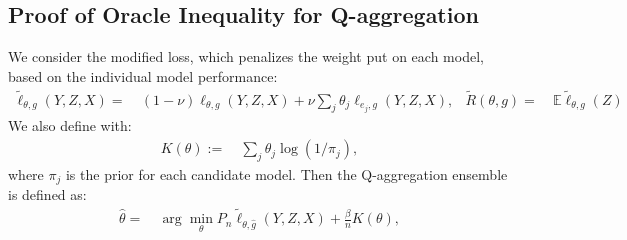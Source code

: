 \documentclass[12pt]{extarticle} %
\newcommand{\E}{\mathbb{E}}
\newcommand{\error}{\ensuremath{\textsc{Error}}}
\begin{document}


\subsection{Proof of Oracle Inequality for Q-aggregation}\label{sec:Q-agg}
We consider the modified loss, which penalizes the weight put on each model, based on the individual model performance:
\begin{align*}
    \tilde{\ell}_{\theta,g}(Y,Z,X) =~& (1-\nu) \ell_{\theta,g}(Y,Z,X) + \nu \sum_{j} \theta_j \ell_{e_j,g}(Y,Z,X), &
    \tilde{R}(\theta,g) =~& \E\tilde{\ell}_{\theta,g}(Z)
\end{align*}
We also define with:
\begin{align*}
    K(\theta) :=~&\sum_{j} \theta_j \log(1/\pi_j),
\end{align*} where $\pi_j$ is the prior for each candidate model.
Then the Q-aggregation ensemble is defined as:
\begin{align*}
    \hat{\theta} =~& \arg\min_{\theta} P_n\tilde{\ell}_{\theta, \hat{g}}(Y,Z,X) + \frac{\beta}{n} K(\theta),
\end{align*}
\end{document}
